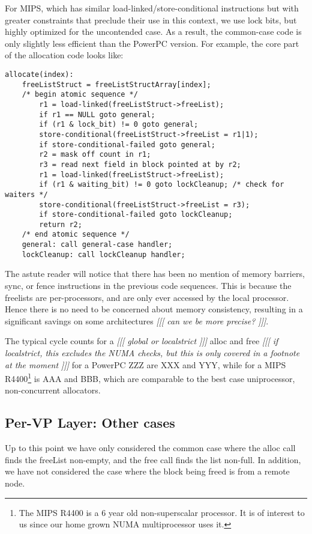 \documentclass[dvips,11pt]{article}
\newcommand\fixnote[1]{\emph{[[[ #1 ]]]}}
\begin{document}
For MIPS, which has similar load-linked/store-conditional instructions but
with greater constraints that preclude their use in this context, we use
lock bits, but highly optimized for the uncontended case.  As a result, the 
common-case code is only slightly less efficient than the PowerPC version.
For example, the core part of the allocation code looks like:
{\footnotesize
\begin{verbatim}
allocate(index):
    freeListStruct = freeListStructArray[index];
    /* begin atomic sequence */
        r1 = load-linked(freeListStruct->freeList);
        if r1 == NULL goto general;
        if (r1 & lock_bit) != 0 goto general;
        store-conditional(freeListStruct->freeList = r1|1);
        if store-conditional-failed goto general;
        r2 = mask off count in r1;
        r3 = read next field in block pointed at by r2;
        r1 = load-linked(freeListStruct->freeList);
        if (r1 & waiting_bit) != 0 goto lockCleanup; /* check for waiters */
        store-conditional(freeListStruct->freeList = r3);
        if store-conditional-failed goto lockCleanup;
        return r2;
    /* end atomic sequence */
    general: call general-case handler;
    lockCleanup: call lockCleanup handler;
\end{verbatim}
}

The astute reader will notice that there has been no mention of memory
barriers, sync, or fence instructions in the previous code sequences.  This
is because the freelists are per-processors, and are only ever accessed by
the local processor.  Hence there is no need to be concerned about memory
consistency, resulting in a significant savings on some architectures
\fixnote{can we be more precise?}.

The typical cycle counts for a \fixnote{global or localstrict} alloc and
free \fixnote{if localstrict, this excludes the NUMA checks, but this is
  only covered in a footnote at the moment} for a PowerPC ZZZ
are XXX and YYY, while for a MIPS R4400\footnote{The MIPS R4400 is a 6 year
  old non-superscalar processor.  It is of interest to us since our home
  grown NUMA multiprocessor uses it.} is AAA and BBB, which are comparable
to the best case uniprocessor, non-concurrent allocators.


\subsection{Per-VP Layer: Other cases}

Up to this point we have only considered the common case where the alloc
call finds the freeList non-empty, and the free call finds the list
non-full.  In addition, we have not considered the case where the block
being freed is from a remote node.
\end{document}
